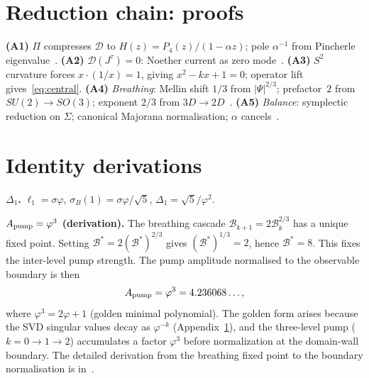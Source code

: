 \documentclass[twocolumn,10pt]{article}
\newcommand{\vp}{\varphi}
\begin{document}
\appendix

\section{Reduction chain: proofs}
\label{app:A}

\textbf{(A1)} $\Pi$ compresses $\mathcal{D}$ to
$H(z)=P_4(z)/(1-\alpha z)$; pole $\alpha^{-1}$ from Pincherle
eigenvalue~\cite{CamP01,CamP02,CamP09}.
\textbf{(A2)} $\mathcal{D}(J^\tau)=0$: Noether current as zero
mode~\cite{CamP00,CamP06}.
\textbf{(A3)} $S^2$ curvature forces $x\cdot(1/x)=1$, giving
$x^2-kx+1=0$; operator lift gives~\eqref{eq:central}.
\textbf{(A4)} \textit{Breathing}: Mellin shift $1/3$ from
$|\Psi|^{2/3}$; prefactor~$2$ from $SU(2)\to SO(3)$; exponent $2/3$
from $3D\to2D$~\cite{CamP05,CamP11}.
\textbf{(A5)} \textit{Balance}: symplectic reduction on $\Sigma$;
canonical Majorana normalisation; $\alpha$ cancels~\cite{CamP06}.

\section{Identity derivations}
\label{app:B}

\noindent\textbf{$\Delta_1$.}
$\ell_1=\sigma\vp$, $\sigma_B(1)=\sigma\vp/\sqrt{5}$,
$\Delta_1=\sqrt{5}/\vp^2$.

\medskip
\noindent\textbf{$A_{\rm pump}=\vp^3$ (derivation).}
The breathing cascade $\mathcal{B}_{k+1}=2\mathcal{B}_k^{2/3}$ has
a unique fixed point. Setting $\mathcal{B}^*=2(\mathcal{B}^*)^{2/3}$
gives $(\mathcal{B}^*)^{1/3}=2$, hence $\mathcal{B}^*=8$. This
fixes the inter-level pump strength. The pump amplitude normalised
to the observable boundary is then~\cite{CamP12}
\begin{equation*}
  A_{\rm pump} = \vp^3 = 4.236068\ldots,
\end{equation*}
where $\vp^3=2\vp+1$ (golden minimal polynomial). The golden form
arises because the SVD singular values decay as $\vp^{-k}$
(Appendix~\ref{app:A}), and the three-level pump
($k=0\to1\to2$) accumulates a factor $\vp^3$ before normalization
at the domain-wall boundary. The detailed derivation from the
breathing fixed point to the boundary normalisation is in~\cite{CamP12}.
\end{document}
